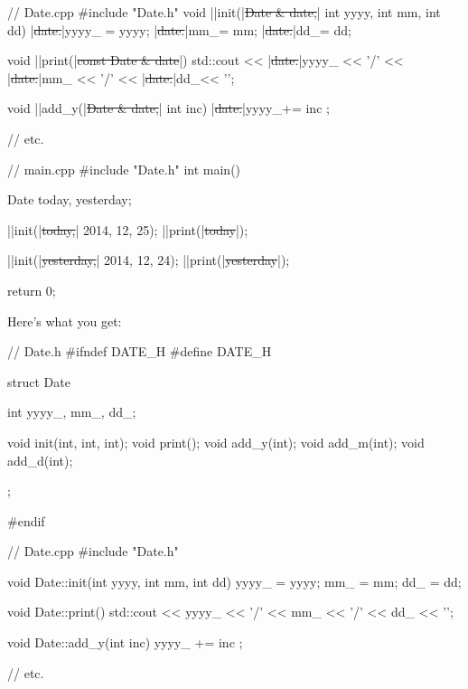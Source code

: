 \begin{consolethree}[escapeinside=||]
// Date.cpp
#include "Date.h"
void ||init(|\sout{Date \& date,}| int yyyy, int mm, int dd)
{
    |\sout{date.}|yyyy_ = yyyy;
    |\sout{date.}|mm_= mm;
    |\sout{date.}|dd_= dd;
}

void ||print(|\sout{const Date \& date}|)
{
    std::cout << |\sout{date.}|yyyy_ << '/'
              << |\sout{date.}|mm_ << '/'
              << |\sout{date.}|dd_<< '\n';
}

void ||add_y(|\sout{Date \& date,}| int inc)
{
    |\sout{date.}|yyyy_+= inc ;
}

// etc.
\end{consolethree}
\begin{consolethree}[escapeinside=||]
// main.cpp
#include "Date.h"
int main()
{
    Date today, yesterday;

    ||init(|\sout{today,}| 2014, 12, 25);
    ||print(|\sout{today}|);

    ||init(|\sout{yesterday,}| 2014, 12, 24);
    ||print(|\sout{yesterday}|);

    return 0;
}
\end{consolethree}
Here's what you get:

\begin{consolethree}[escapeinside=||]
// Date.h
#ifndef DATE_H
#define DATE_H

struct Date
{
    int yyyy_, mm_, dd_;

    void init(int, int, int);
    void print();
    void add_y(int);
    void add_m(int);
    void add_d(int);
};

#endif
\end{consolethree}

\begin{consolethree}[escapeinside=||]
// Date.cpp
#include "Date.h"

void Date::init(int yyyy, int mm, int dd)
{
    yyyy_ = yyyy;
    mm_ = mm;
    dd_ = dd;
}

void Date::print()
{
    std::cout << yyyy_ << '/'
              << mm_ << '/'
              << dd_ << '\n';
}

void Date::add_y(int inc)
{
    yyyy_ += inc ;
}

// etc.
\end{consolethree}

